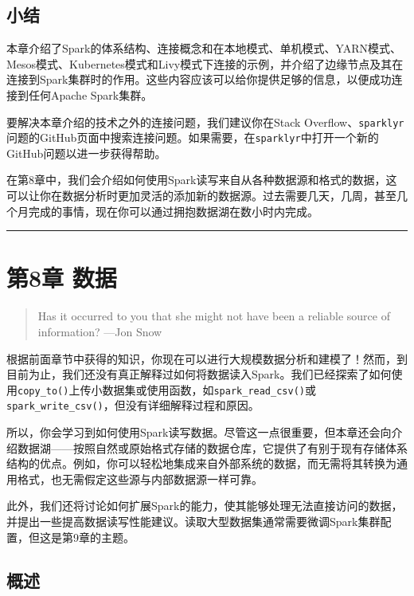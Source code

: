 \documentclass[
]{article}
\begin{document}
\hypertarget{ux5c0fux7ed3-5}{%
\subsection{小结}\label{ux5c0fux7ed3-5}}

本章介绍了Spark的体系结构、连接概念和在本地模式、单机模式、YARN模式、Mesos模式、Kubernetes模式和Livy模式下连接的示例，并介绍了边缘节点及其在连接到Spark集群时的作用。这些内容应该可以给你提供足够的信息，以便成功连接到任何Apache
Spark集群。

要解决本章介绍的技术之外的连接问题，我们建议你在Stack
Overflow、\texttt{sparklyr}问题的GitHub页面中搜索连接问题。如果需要，在\texttt{sparklyr}中打开一个新的GitHub问题以进一步获得帮助。

在第8章中，我们会介绍如何使用Spark读写来自从各种数据源和格式的数据，这可以让你在数据分析时更加灵活的添加新的数据源。过去需要几天，几周，甚至几个月完成的事情，现在你可以通过拥抱数据湖在数小时内完成。

\begin{center}\rule{0.5\linewidth}{\linethickness}\end{center}

\hypertarget{ux7b2c8ux7ae0-ux6570ux636e}{%
\section{第8章 数据}\label{ux7b2c8ux7ae0-ux6570ux636e}}

\begin{quote}
Has it occurred to you that she might not have been a reliable source of
information? ---Jon Snow
\end{quote}

根据前面章节中获得的知识，你现在可以进行大规模数据分析和建模了！然而，到目前为止，我们还没有真正解释过如何将数据读入Spark。我们已经探索了如何使用\texttt{copy\_to()}上传小数据集或使用函数，如\texttt{spark\_read\_csv()}或
\texttt{spark\_write\_csv()}，但没有详细解释过程和原因。

所以，你会学习到如何使用Spark读写数据。尽管这一点很重要，但本章还会向介绍数据湖------按照自然或原始格式存储的数据仓库，它提供了有别于现有存储体系结构的优点。例如，你可以轻松地集成来自外部系统的数据，而无需将其转换为通用格式，也无需假定这些源与内部数据源一样可靠。

此外，我们还将讨论如何扩展Spark的能力，使其能够处理无法直接访问的数据，并提出一些提高数据读写性能建议。读取大型数据集通常需要微调Spark集群配置，但这是第9章的主题。

\hypertarget{ux6982ux8ff0-7}{%
\subsection{概述}\label{ux6982ux8ff0-7}}
\end{document}
